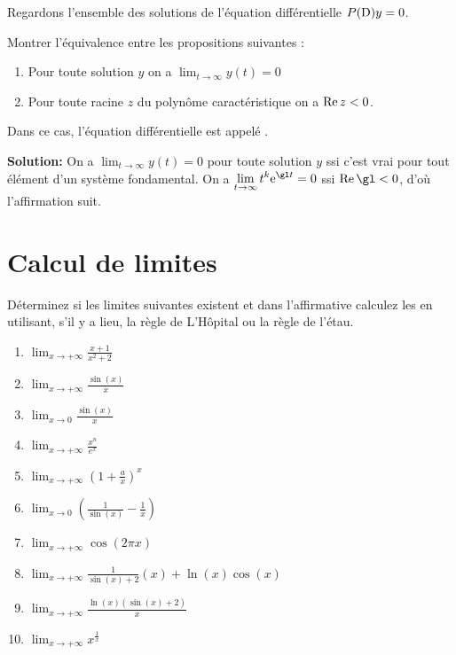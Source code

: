 \bigskip
\exerNico
Regardons l'ensemble des solutions de l'équation différentielle $P({\rm D})y =0$.

Montrer l'équivalence entre les propositions suivantes :
\begin{enumerate}

	\item
	      Pour toute solution $y$ on a $\displaystyle \lim_{t \to \infty} y(t) = 0$

	\item
	      Pour toute racine $z$ du polynôme caractéristique on a ${\rm Re}\, z <0$.

\end{enumerate}
Dans ce cas, l'équation différentielle est appelé  .

\bigskip
{\bf Solution:}
On a
$\displaystyle \lim_{t \to \infty} y(t) = 0$ pour toute solution $y$ ssi c'est vrai pour tout élément d'un système fondamental.
On a $\displaystyle \lim_{t \to \infty} t^k {\rm e}^{\gl t}=0$ ssi ${\rm Re }\,\gl <0$,
d'où l'affirmation suit.






\section{Calcul de limites}

\exerNico Déterminez si les limites suivantes existent et dans
l'affirmative calculez les en utilisant, s'il y a lieu, la règle de
L'Hôpital ou la règle de l'étau.
\begin{enumerate}
	\item $  \lim_{x \rightarrow  +\infty} \frac{x+1}{x^2+2} $
	\item $  \lim_{x \rightarrow  +\infty} \frac{\sin(x)}{x} $
	\item $  \lim_{x \rightarrow  0} \frac{\sin(x)}{x} $
	\item $  \lim_{x \rightarrow  +\infty}  \frac{x ^n}{e ^x} $
	\item $  \lim_{x \rightarrow  +\infty} (1 + \frac{a}{x})^x $
	\item $  \lim_{x \rightarrow  0} (\frac{1}{\sin(x)} - \frac{1}{x} )$
	\item $  \lim_{x \rightarrow  +\infty} \cos( 2 \pi x) $
	\item $  \lim_{x \rightarrow  +\infty} \frac{1}{\sin(x)+2}(x) +\ln(x)\cos(x) $
	\item $  \lim_{x \rightarrow  +\infty} \frac{ \ln(x)(\sin(x) +2)}{x} $
	\item $  \lim_{x \rightarrow  +\infty} x ^\frac{1}{x} $
\end{enumerate}


